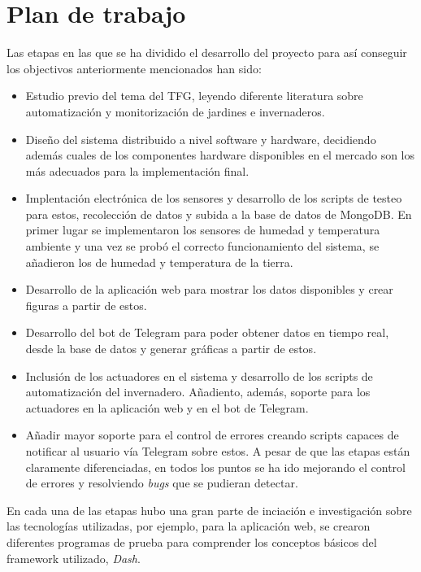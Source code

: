 \documentclass[a4paper, 12pt, oneside]{book}
\begin{document}
\section{Plan de trabajo}
\label{plan de trabajo}
Las etapas en las que se ha dividido el desarrollo del proyecto para así conseguir los objectivos anteriormente mencionados han sido:

\begin{itemize}
\item Estudio previo del tema del TFG, leyendo diferente literatura sobre automatización y monitorización de jardines e invernaderos.

\item Diseño del sistema distribuido a nivel software y hardware, decidiendo además cuales de los componentes hardware disponibles en el mercado son los más adecuados para la implementación final.

\item Implentación electrónica de los sensores y desarrollo de los scripts de testeo para estos, recolección de datos y subida a la base de datos de MongoDB. En primer lugar se implementaron los sensores de humedad y temperatura ambiente y una vez se probó el correcto funcionamiento del sistema, se añadieron los de humedad y temperatura de la tierra.

\item Desarrollo de la aplicación web para mostrar los datos disponibles y crear figuras a partir de estos.

\item Desarrollo del bot de Telegram para poder obtener datos en tiempo real, desde la base de datos y generar gráficas a partir de estos.

\item Inclusión de los actuadores en el sistema y desarrollo de los scripts de automatización del invernadero. Añadiento, además, soporte para los actuadores en la aplicación web y en el bot de Telegram.

\item Añadir mayor soporte para el control de errores creando scripts capaces de notificar al usuario vía Telegram sobre estos. A pesar de que las etapas están claramente diferenciadas, en todos los puntos se ha ido mejorando el control de errores y resolviendo \textit{bugs} que se pudieran detectar. 

\end{itemize}

En cada una de las etapas hubo una gran parte de inciación e investigación sobre las tecnologías utilizadas, por ejemplo, para la aplicación web, se crearon diferentes programas de prueba para comprender los conceptos básicos del framework utilizado, \textit{Dash}.
  
\end{document}
